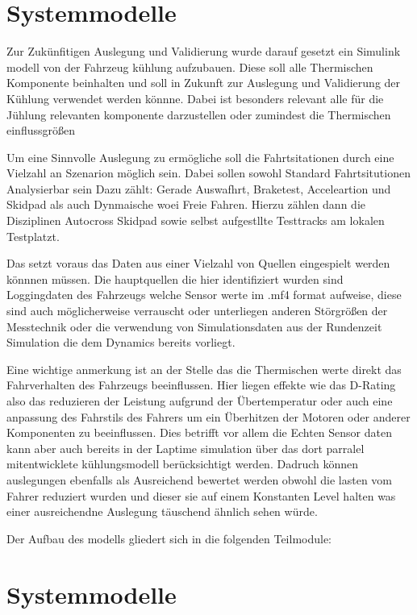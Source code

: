 \chapter{Systemmodelle}
\label{ch:messtechnik}

Zur Zukünfitigen Auslegung und Validierung wurde darauf gesetzt ein Simulink modell von der Fahrzeug kühlung aufzubauen. Diese soll alle Thermischen Komponente beinhalten und soll in Zukunft zur Auslegung und Validierung der Kühlung verwendet werden könnne. Dabei ist besonders relevant alle für die Jühlung relevanten komponente darzustellen oder zumindest die Thermischen einflussgrößen

Um eine Sinnvolle Auslegung zu ermögliche soll die Fahrtsitationen durch eine Vielzahl an Szenarion möglich sein. Dabei sollen sowohl Standard Fahrtsitutionen Analysierbar sein Dazu zählt: Gerade Auswafhrt, Braketest, Acceleartion und Skidpad als auch Dynmaische woei Freie Fahren. Hierzu zählen dann die Disziplinen Autocross Skidpad sowie selbst aufgestllte Testtracks am lokalen Testplatzt. 

Das setzt voraus das Daten aus einer Vielzahl von Quellen eingespielt werden könnnen müssen. Die hauptquellen die hier identifiziert wurden sind Loggingdaten des Fahrzeugs welche Sensor werte im .mf4 format aufweise, diese sind auch möglicherweise verrauscht oder unterliegen anderen Störgrößen der Messtechnik oder die verwendung von Simulationsdaten aus der Rundenzeit Simulation die dem Dynamics bereits vorliegt.

Eine wichtige anmerkung ist an der Stelle das die Thermischen werte direkt das Fahrverhalten des Fahrzeugs beeinflussen. Hier liegen effekte wie das D-Rating also das reduzieren der Leistung aufgrund der Übertemperatur oder auch eine anpassung des Fahrstils des Fahrers um ein Überhitzen der Motoren oder anderer Komponenten zu beeinflussen. Dies betrifft vor allem die Echten Sensor daten kann aber auch bereits in der Laptime simulation über das dort parralel mitentwicklete kühlungsmodell berücksichtigt werden. Dadruch können auslegungen ebenfalls als Ausreichend bewertet werden obwohl die lasten vom Fahrer reduziert wurden und dieser sie auf einem Konstanten Level halten was einer ausreichendne Auslegung täuschend ähnlich sehen würde. 

Der Aufbau des modells gliedert sich in die folgenden Teilmodule:

\chapter{Systemmodelle}
\label{ch:systemmodelle}


